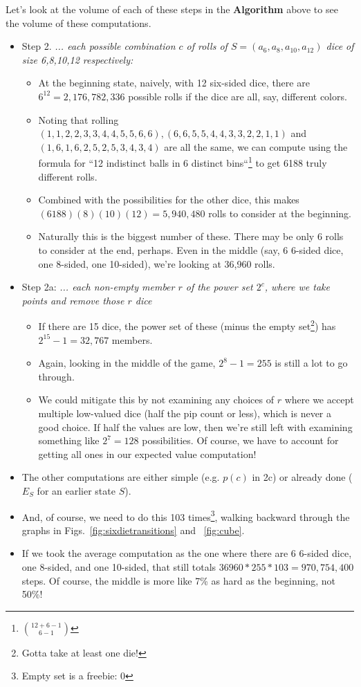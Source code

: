\documentclass[11pt, oneside]{article} 	%
\begin{document}
Let's look at the volume of each of these steps in the \textbf{Algorithm} above to see the volume of these computations.
\begin{itemize}
\item Step 2.  \emph{... each possible combination $c$ of rolls of $S = (a_6, a_8, a_{10}, a_{12})$ dice of size 6,8,10,12 respectively:}

  \begin{itemize}
  \item At the beginning state, naively, with 12 six-sided dice, there are $6^12 = 2,176,782,336$ possible rolls if the dice are all, say, different colors.
  \item Noting that rolling $(1,1,2,2,3,3,4,4,5,5,6,6), (6,6,5,5,4,4,3,3,2,2,1,1)$ and $(1,6,1,6,2,5,2,5,3,4,3,4) $ are all the same, we can compute using the formula for ``12 indistinct balls in 6 distinct bins``\footnote{${12 + 6 - 1 \choose 6 - 1}$} to get 6188 truly different rolls.
  \item Combined with the possibilities for the other dice, this makes $(6188)(8)(10)(12) = 5,940,480$ rolls to consider at the beginning. 
  \item Naturally this is the biggest number of these. There may be only 6 rolls to consider at the end, perhaps.  Even in the middle (say, 6 6-sided dice, one 8-sided, one 10-sided), we're looking at 36,960 rolls.
  \end{itemize}
  
    
\item Step 2a: \emph{... each non-empty member $r$ of the power set $2^c$, where we take points and remove those $r$ dice}
  \begin{itemize}
  \item If there are 15 dice, the power set of these (minus the empty set\footnote{Gotta take at least one die!}) has $2^{15} - 1 = 32,767$ members.
  \item Again, looking in the middle of the game, $2^8 - 1 = 255$	 is still a lot to go through.
  \item We could mitigate this by not examining any choices  of $r$ where we accept multiple low-valued dice (half the pip count or less), which is never a good choice.  If half the values are low, then we're still left with examining something like $2^7=128$ possibilities.  Of course, we have to account for getting all ones in our expected value computation!
  \end{itemize}
\item The other computations are either simple (e.g. $p(c)$ in 2c) or already done ($E_S$ for an earlier state $S$).
\item And, of course, we need to do this 103 times\footnote{Empty set is a freebie: 0}, walking backward through the graphs in Figs.~\ref{fig:sixdietransitions} and ~\ref{fig:cube}.
\item If we took the average computation as the one where there are 6 6-sided dice, one 8-sided, and one 10-sided, that still totals $36960*255*103 = 970,754,400$ steps.  Of course, the middle is more like 7\% as hard as the beginning, not 50\%!
\end{itemize}
\end{document}
